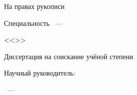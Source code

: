 \thispagestyle{empty}%
\begin{center}%
\thesisOrganization
\end{center}%
%
\vspace{0pt plus4fill} %
\begin{flushright}%
На правах рукописи

\end{flushright}%
%
\vspace{0pt plus6fill} %
\begin{center}%
{\large \thesisAuthor}
\end{center}%
%
\vspace{0pt plus1fill} %
\begin{center}%
\textbf {\large \thesisTitle}

\vspace{0pt plus2fill} %
{%
Специальность \thesisSpecialtyNumber~---

<<\thesisSpecialtyTitle>>
}

\vspace{0pt plus2fill} %
Диссертация на соискание учёной степени

\thesisDegree
\end{center}%
%
\vspace{0pt plus4fill} %
\begin{flushright}%
Научный руководитель:

\supervisorRegalia

\supervisorFio
\end{flushright}%
%
\vspace{0pt plus4fill} %
\begin{center}%
{\thesisCity~--- \thesisYear}
\end{center}%
\newpage

